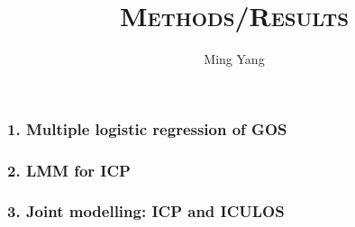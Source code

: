 \documentclass{article}
\begin{document}
\title{\textsc{Methods/Results}}
\author{Ming Yang}
\date{}
\maketitle



\subsubsection*{1. Multiple logistic regression of GOS}


\subsubsection*{2. LMM for ICP}




\subsubsection*{3. Joint modelling: ICP and ICULOS}
\end{document}
